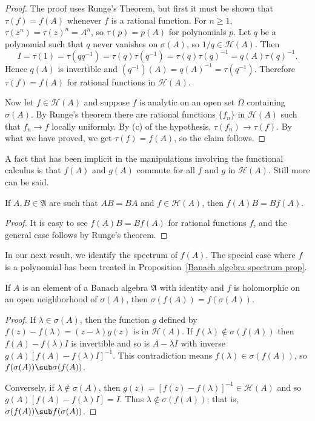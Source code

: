 \begin{proof}
The proof uses Runge's Theorem, but first it must be shown that $\tau(f)=f(A)$ whenever $f$ is a rational function. For $n\geq 1$, $\tau(z^n)=\tau(z)^n=A^n$, so $\tau(p)=p(A)$ for polynomials $p$. Let $q$ be a polynomial such that $q$ never vanishes on $\sigma(A)$, so $1/q\in\mathcal{H}(A)$. Then
\[I=\tau(1)=\tau(qq^{-1})=\tau(q)\tau(q^{-1})=\tau(q)\tau(q)^{-1}=q(A)\tau(q)^{-1}.\]
Hence $q(A)$ is invertible and $(q^{-1})(A)=q(A)^{-1}=\tau(q^{-1})$. Therefore $\tau(f)=f(A)$ for rational functions in $\mathcal{H}(A)$.\par
Now let $f\in\mathcal{H}(A)$ and suppose $f$ is analytic on an open set $\Omega$ containing $\sigma(A)$. By Runge's theorem there are rational functions $\{f_n\}$ in $\mathcal{H}(A)$ such that $f_n\to f$ locally uniformly. By (c) of the hypothesis, $\tau(f_n)\to\tau(f)$. By what we have proved, we get $\tau(f)=f(A)$, so the claim follows.
\end{proof}
A fact that has been implicit in the manipulations involving the functional
calculus is that $f(A)$ and $g(A)$ commute for all $f$ and $g$ in $\mathcal{H}(A)$. Still more can be said.
\begin{proposition}
If $A,B\in\mathfrak{A}$ are such that $AB=BA$ and  $f\in\mathcal{H}(A)$, then $f(A)B=Bf(A)$.
\end{proposition}
\begin{proof}
It is easy to see $f(A)B=Bf(A)$ for rational functions $f$, and the general case follows by Runge's theorem.
\end{proof}
In our next result, we identify the spectrum of $f(A)$. The special case where $f$ is a polynomial has been treated in Proposition~\ref{Banach algebra spectrum prop}.
\begin{theorem}
If $A$ is an element of a Banach algebra $\mathfrak{A}$ with identity and $f$ is holomorphic on an open neighborhood of $\sigma(A)$, then $\sigma(f(A))=f(\sigma(A))$.
\end{theorem}
\begin{proof}
If $\lambda\in\sigma(A)$, then the function $g$ defined by $f(z)-f(\lambda)=(z-\lambda)g(z)$ is in $\mathcal{H}(A)$. If $f(\lambda)\notin\sigma(f(A))$ then $f(A)-f(\lambda)I$ is invertible and so is $A-\lambda I$ with inverse $g(A)[f(A)-f(\lambda)I]^{-1}$. This contradiction means $f(\lambda)\in\sigma(f(A))$, so $f(\sigma(A))\sub\sigma(f(A))$.\par
Conversely, if $\lambda\notin\sigma(A)$, then $g(z)=[f(z)-f(\lambda)]^{-1}\in\mathcal{H}(A)$ and so $g(A)[f(A)-f(\lambda)I]=I$. Thus $\lambda\notin\sigma(f(A))$; that is, $\sigma(f(A))\sub f(\sigma(A))$.
\end{proof}

